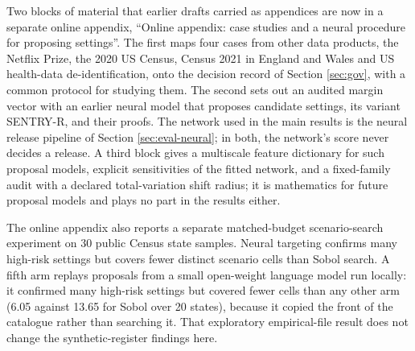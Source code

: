 \documentclass[11pt,a4paper]{article}
\theoremstyle{plain}
\theoremstyle{definition}
\theoremstyle{definition}
\theoremstyle{plain}
\begin{document}
Two blocks of material that earlier drafts carried as appendices are now in a
separate online appendix, ``Online appendix: case studies and a neural procedure
for proposing settings''. The first maps four cases from other data products,
the Netflix Prize, the 2020 US Census, Census 2021 in England and Wales and US
health-data de-identification, onto the decision record of Section \ref{sec:gov},
with a common protocol for studying them. The second sets out an audited margin
vector with an earlier neural model that proposes candidate settings, its variant
SENTRY-R, and their proofs. The network used in the main results is the neural
release pipeline of Section \ref{sec:eval-neural}; in both, the network's score
never decides a release. A third block gives a
multiscale feature dictionary for such proposal models, explicit sensitivities of
the fitted network, and a fixed-family audit with a declared total-variation
shift radius; it is mathematics for future proposal models and plays no part in
the results either.

The online appendix also reports a separate matched-budget scenario-search
experiment on 30 public Census state samples. Neural targeting confirms many
high-risk settings but covers fewer distinct scenario cells than Sobol search.
A fifth arm replays proposals from a small open-weight language model run
locally: it confirmed many high-risk settings but covered fewer cells than any
other arm (6.05 against 13.65 for Sobol over
20 states), because it copied the front of the catalogue rather
than searching it. That exploratory empirical-file result does not change the
synthetic-register findings here.


\end{document}
